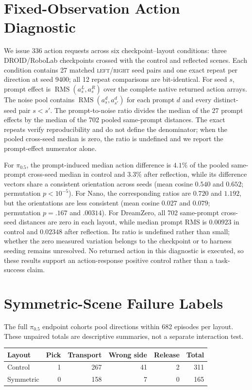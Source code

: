 \documentclass[letterpaper,10pt,conference]{ieeeconf}%
\newcommand{\tokLR}{\textsc{left}/\textsc{right}}
\begin{document}
\section{Fixed-Observation Action Diagnostic}
\label{app:fixed_observation}

We issue 336 action requests across six checkpoint--layout conditions: three DROID/RoboLab checkpoints crossed with the control and reflected scenes.
Each condition contains 27 matched \tokLR{} seed pairs and one exact repeat per direction at seed 9400; all 12 repeat comparisons are bit-identical.
For seed $s$, prompt effect is $\operatorname{RMS}(a_s^L,a_s^R)$ over the complete native returned action arrays.
The noise pool contains $\operatorname{RMS}(a_s^d,a_{s'}^d)$ for each prompt $d$ and every distinct-seed pair $s<s'$.
The prompt-to-noise ratio divides the median of the 27 prompt effects by the median of the 702 pooled same-prompt distances.
The exact repeats verify reproducibility and do not define the denominator; when the pooled cross-seed median is zero, the ratio is undefined and we report the prompt-effect numerator alone.

For $\pi_{0.5}$, the prompt-induced median action difference is $4.1\%$ of the pooled same-prompt cross-seed median in control and $3.3\%$ after reflection, while its difference vectors share a consistent orientation across seeds (mean cosine $0.540$ and $0.652$; permutation $p<10^{-5}$).
For Nano, the corresponding ratios are $0.720$ and $1.192$, but the orientations are less consistent (mean cosine $0.027$ and $0.079$; permutation $p=.167$ and $.00314$).
For DreamZero, all 702 same-prompt cross-seed distances are zero in each layout, while median prompt RMS is $0.00923$ in control and $0.02348$ after reflection.
Its ratio is undefined rather than small; whether the zero measured variation belongs to the checkpoint or to harness seeding remains unresolved.
No returned action in this diagnostic is executed, so these results support an action-response positive control rather than a task-success claim.

\section{Symmetric-Scene Failure Labels}
\label{app:failure_labels}

The full $\pi_{0.5}$ endpoint cohorts pool directions within 682 episodes per layout.
These unpaired totals are descriptive summaries, not a separate interaction test.
\begin{center}
  \centering
  \scriptsize
  \setlength{\tabcolsep}{3pt}
  \begin{tabular}{@{}lrrrrr@{}}
    \toprule
    Layout & Pick & Transport & Wrong side & Release & Total \\
    \midrule
    Control & 1 & 267 & 41 & 2 & 311 \\
    Symmetric & 0 & 158 & 7 & 0 & 165 \\
    \bottomrule
  \end{tabular}
\end{center}
\end{document}
